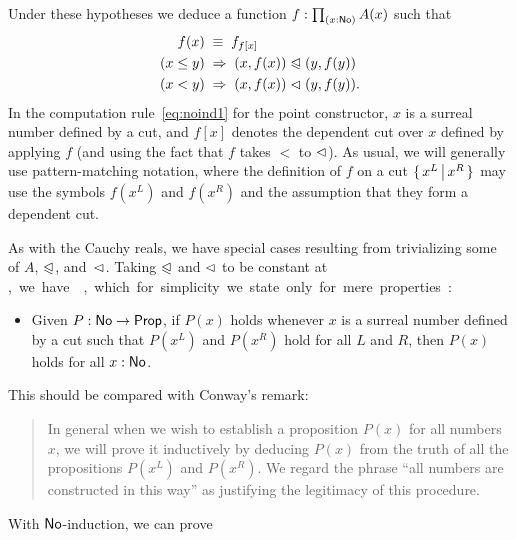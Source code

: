 Under these hypotheses we deduce a function $f:\prd{x:\NO} A(x)$ such that
\begin{align}
  f(x) &\;\equiv\; f_{f[x]} \label{eq:noind1}\\
  (x\le y) &\;\Rightarrow\; (x,f(x)) \trianglelefteqslant (y,f(y)) \notag\\
  (x< y) &\;\Rightarrow\; (x,f(x)) \vartriangleleft (y,f(y)). \notag
\end{align}
In the computation rule~\eqref{eq:noind1} for the point constructor, $x$ is a surreal number defined by a cut, and $f[x]$ denotes the dependent cut over $x$ defined by applying $f$ (and using the fact that $f$ takes $<$ to $\vartriangleleft$).
As usual, we will generally use pattern-matching notation, where the definition of $f$ on a cut $\{\,x^L\,\big|\,x^R\,\}$ may use the symbols $f(x^L)$ and $f(x^R)$ and the assumption that they form a dependent cut.

As with the Cauchy reals, we have special cases resulting from trivializing some of $A$, $\trianglelefteqslant$, and~$\vartriangleleft$.
Taking $\trianglelefteqslant$ and $\vartriangleleft$ to be constant at \unit, we have , which for simplicity we state only for mere properties:
\begin{itemize}
\item Given $P:\mathsf{No}\to\mathsf{Prop}$, if $P(x)$ holds whenever $x$ is a surreal number defined by a cut such that $P(x^L)$ and $P(x^R)$ hold for all
$L$ and $R$, then $P(x)$ holds for all $x:\mathsf{No}$.
\end{itemize}
This should be compared with Conway's remark:
\begin{quote}\footnotesize
  In general when we wish to establish a proposition $P(x)$ for all numbers $x$, we will prove it inductively by deducing $P(x)$ from the truth of all the propositions $P(x^L)$ and $P(x^R)$.
  We regard the phrase ``all numbers are constructed in this way'' as justifying the legitimacy of this procedure.
\end{quote}
With $\mathsf{No}$-induction, we can prove

